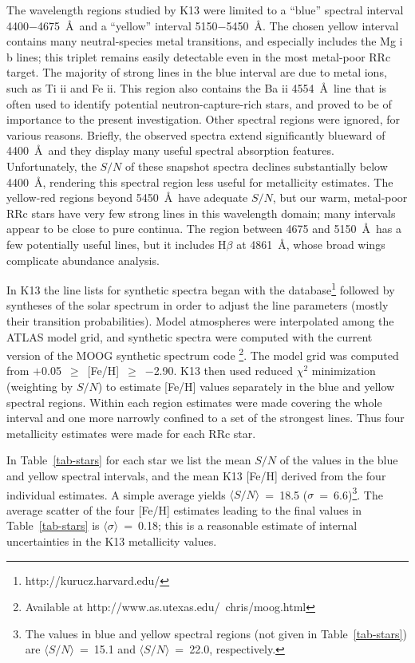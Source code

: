 \documentclass[preprint]{aastex6}
\newcommand\species[2]{#1 {\sc #2}}
\begin{document}
The wavelength regions studied by K13 were limited to a 
``blue'' spectral interval 4400$-$4675~\AA\ and a ``yellow'' interval 
5150$-$5450~\AA.  
The chosen yellow interval contains many neutral-species metal transitions, and
especially includes the \species{Mg}{i} b lines; this triplet remains easily
detectable even in the most metal-poor RRc target.  
The majority of strong lines in the blue interval are due to 
metal ions, such as \species{Ti}{ii} and \species{Fe}{ii}.
This region also contains the \species{Ba}{ii} 4554~\AA\ line that is often
used to identify potential neutron-capture-rich stars, and proved to be of
importance to the present investigation.
Other spectral regions were ignored, for various reasons.
Briefly, the observed spectra extend significantly blueward of 4400~\AA\ and 
they display many useful spectral absorption features.
Unfortunately, the $S/N$ of these snapshot spectra declines 
substantially below 4400~\AA, rendering this spectral region less useful for 
metallicity estimates.
The yellow-red regions beyond 5450~\AA\ have adequate $S/N$, but our
warm, metal-poor RRc stars have very few strong lines in this wavelength
domain; many intervals appear to be close to pure continua.
The region between 4675 and 5150~\AA\ has a few potentially useful lines,
but it includes H$\beta$ at 4861~\AA, whose broad wings 
complicate abundance analysis.

In K13 the line lists for synthetic spectra began with the \cite{kurucz11} 
database\footnote{
http://kurucz.harvard.edu/}
followed by syntheses of the solar spectrum in order to adjust the line
parameters (mostly their transition probabilities).
Model atmospheres were interpolated among the \citeauthor{kurucz11} ATLAS
model grid, and synthetic spectra were computed with the current version
of the MOOG synthetic spectrum code \citep{sneden73}\footnote{
Available at http://www.as.utexas.edu/~chris/moog.html}.
The model grid was computed from $+$0.05~$\geq$~[Fe/H]~$\geq$~$-$2.90.
K13 then used reduced $\chi^2$ minimization (weighting by $S/N$) to 
estimate [Fe/H] values separately in the blue and yellow spectral regions. 
Within each region estimates were made covering the whole interval and one 
more narrowly confined to a set of the strongest lines.  
Thus four metallicity estimates were made for each RRc star.

In Table~\ref{tab-stars} for each star we list the mean $S/N$ of the values in 
the blue and yellow spectral intervals, and the mean K13 [Fe/H] 
derived from the four individual estimates.
A simple average yields $\langle S/N\rangle$~=~18.5 
($\sigma$~=~6.6)\footnote{
The values in blue and yellow spectral regions (not given in 
Table~\ref{tab-stars}) are $\langle S/N\rangle$~=~15.1 and 
$\langle S/N\rangle$~=~22.0, respectively.}.
The average scatter of the four [Fe/H] estimates leading to the final 
values in Table~\ref{tab-stars} is $\langle\sigma\rangle$~=~0.18; this is
a reasonable estimate of internal uncertainties in the K13 metallicity
values.
\end{document}
